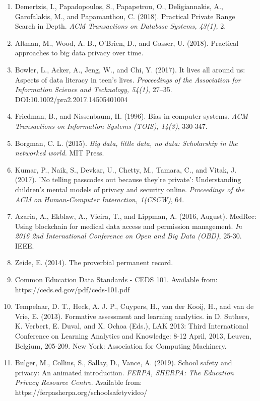 \documentclass{article}
\begin{document}
\begin{enumerate}
    \label{sec:23}
    \item Demertzis, I., Papadopoulos, S., Papapetrou, O., Deligiannakis, A., Garofalakis, M., and Papamanthou, C. (2018). Practical Private Range Search in Depth. \textit{ACM Transactions on Database Systems, 43(1),} 2.
    \label{sec:24}
    \item Altman, M., Wood, A. B., O'Brien, D., and Gasser, U. (2018). Practical approaches to big data privacy over time.
    \label{sec:25}
    \item Bowler, L., Acker, A., Jeng, W., and Chi, Y. (2017). It lives all around us: Aspects of data literacy in teen’s lives. \textit{Proceedings of the Association for Information Science and Technology, 54(1)}, 27–35. DOI:10.1002/pra2.2017.14505401004 
    \label{sec:26}
    \item Friedman, B., and Nissenbaum, H. (1996). Bias in computer systems. \textit{ACM Transactions on Information Systems (TOIS), 14(3)}, 330-347.
    \label{sec:27}
    \item Borgman, C. L. (2015). \textit{Big data, little data, no data: Scholarship in the networked world.} MIT Press.
    \label{sec:28}
    \item Kumar, P., Naik, S., Devkar, U., Chetty, M., Tamara, C., and Vitak, J. (2017). 'No telling passcodes out because they’re private’: Understanding children’s mental models of privacy and security online. \textit{Proceedings of the ACM on Human-Computer Interaction, 1(CSCW)}, 64.
    \label{sec:29}
    \item Azaria, A., Ekblaw, A., Vieira, T., and Lippman, A. (2016, August). MedRec: Using blockchain for medical data access and permission management. \textit{In 2016 2nd International Conference on Open and Big Data (OBD)},  25-30. IEEE.
    \label{sec:30}
    \item Zeide, E. (2014). The proverbial permanent record.
    \label{sec:31}
    \item Common Education Data Standards - CEDS 101. Available from: https://ceds.ed.gov/pdf/ceds-101.pdf
    \label{sec:32}
    \item Tempelaar, D. T., Heck, A. J. P., Cuypers, H., van der Kooij, H., and van de Vrie, E. (2013). Formative assessment and learning analytics. in D. Suthers, K. Verbert, E. Duval, and X. Ochoa (Eds.), LAK 2013: Third International Conference on Learning Analytics and Knowledge: 8-12 April, 2013, Leuven, Belgium, 205-209. New York: Association for Computing Machinery. 
    \label{sec:33}
    \item Bulger, M., Collins, S., Sallay, D., Vance, A. (2019). School safety and privacy: An animated introduction. \textit{FERPA, SHERPA: The Education Privacy Resource Centre}. Available from: https://ferpasherpa.org/schoolsafetyvideo/

\end{enumerate}
\end{document}
